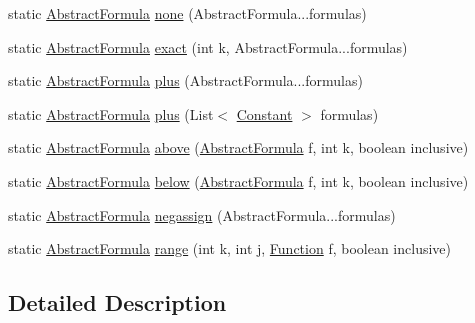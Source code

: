 \begin{DoxyCompactItemize}
\item 
static \hyperlink{classuran_1_1formula_1_1_abstract_formula}{Abstract\+Formula} \hyperlink{classuran_1_1formula_1_1_formula_builder_a7aef5ab233718ba61e4748d8f363e6a0}{none} (Abstract\+Formula...\+formulas)
\item 
static \hyperlink{classuran_1_1formula_1_1_abstract_formula}{Abstract\+Formula} \hyperlink{classuran_1_1formula_1_1_formula_builder_a8a3b18603167b29bea8e504ae55e8630}{exact} (int k, Abstract\+Formula...\+formulas)
\item 
static \hyperlink{classuran_1_1formula_1_1_abstract_formula}{Abstract\+Formula} \hyperlink{classuran_1_1formula_1_1_formula_builder_adbd35dbca246de85fbec3ce74147d2b0}{plus} (Abstract\+Formula...\+formulas)
\item 
static \hyperlink{classuran_1_1formula_1_1_abstract_formula}{Abstract\+Formula} \hyperlink{classuran_1_1formula_1_1_formula_builder_a6821d484c21c9b05b51b8e462c724daa}{plus} (List$<$ \hyperlink{classuran_1_1formula_1_1_constant}{Constant} $>$ formulas)
\item 
static \hyperlink{classuran_1_1formula_1_1_abstract_formula}{Abstract\+Formula} \hyperlink{classuran_1_1formula_1_1_formula_builder_a12b44f4c9e540a9b4e00bb65cc7b9f41}{above} (\hyperlink{classuran_1_1formula_1_1_abstract_formula}{Abstract\+Formula} f, int k, boolean inclusive)
\item 
static \hyperlink{classuran_1_1formula_1_1_abstract_formula}{Abstract\+Formula} \hyperlink{classuran_1_1formula_1_1_formula_builder_a7a7c2f674a038c43fd97dc23fa7000a1}{below} (\hyperlink{classuran_1_1formula_1_1_abstract_formula}{Abstract\+Formula} f, int k, boolean inclusive)
\item 
static \hyperlink{classuran_1_1formula_1_1_abstract_formula}{Abstract\+Formula} \hyperlink{classuran_1_1formula_1_1_formula_builder_a7aba28e616231a95339e0b2d7b0b6f0c}{negassign} (Abstract\+Formula...\+formulas)
\item 
static \hyperlink{classuran_1_1formula_1_1_abstract_formula}{Abstract\+Formula} \hyperlink{classuran_1_1formula_1_1_formula_builder_ad53585a072b50c7065bf0875a663a9fd}{range} (int k, int j, \hyperlink{classuran_1_1formula_1_1_function}{Function} f, boolean inclusive)
\end{DoxyCompactItemize}


\subsection{Detailed Description}



